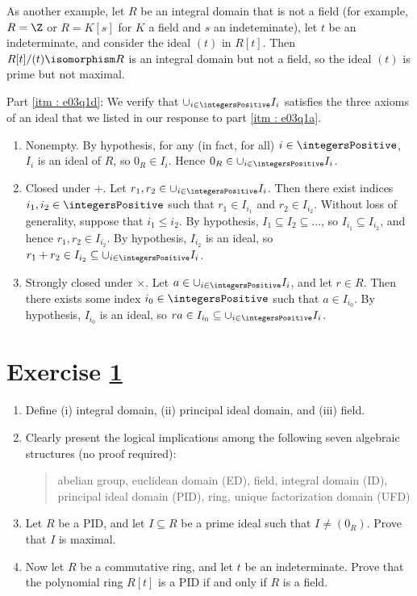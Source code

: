 {As another example, let $R$ be an integral domain that is not a field (for example, $R = \Z$ or $R = K[s]$ for $K$ a field and $s$ an indeteminate), let $t$ be an indeterminate, and consider the ideal $(t)$ in $R[t]$. Then $R[t] / (t) \isomorphism R$ is an integral domain but not a field, so the ideal $(t)$ is prime but not maximal.

Part \ref{itm : e03q1d}: We verify that $\cup_{i \in \integersPositive} I_{i}$ satisfies the three axioms of an ideal that we listed in our response to part \ref{itm : e03q1a}.
\begin{enumerate}
\item Nonempty. By hypothesis, for any (in fact, for all) $i \in \integersPositive$, $I_{i}$ is an ideal of $R$, so $0_{R} \in I_{i}$. Hence $0_{R} \in \cup_{i \in \integersPositive} I_{i}$.
\item Closed under $+$. Let $r_{1}, r_{2} \in \cup_{i \in \integersPositive} I_{i}$. Then there exist indices $i_{1}, i_{2} \in \integersPositive$ such that $r_{1} \in I_{i_{1}}$ and $r_{2} \in I_{i_{2}}$. Without loss of generality, suppose that $i_{1} \leq i_{2}$. By hypothesis, $I_{1} \subseteq I_{2} \subseteq \ldots$, so $I_{i_{1}} \subseteq I_{i_{2}}$, and hence $r_{1}, r_{2} \in I_{i_{2}}$. By hypothesis, $I_{i_{2}}$ is an ideal, so $r_{1} + r_{2} \in I_{i_{2}} \subseteq \cup_{i \in \integersPositive} I_{i}$.
\item Strongly closed under $\times$. Let $a \in \cup_{i \in \integersPositive} I_{i}$, and let $r \in R$. Then there exists some index $i_{0} \in \integersPositive$ such that $a \in I_{i_{0}}$. By hypothesis, $I_{i_{0}}$ is an ideal, so $r a \in I_{i_{0}} \subseteq \cup_{i \in \integersPositive} I_{i}$.
\end{enumerate}}%



\section{Exercise \ref{sec : e03q2}}
\label{sec : e03q2}

\begin{enumerate}[label=(\alph*)]
\item\label{itm : e03q2a} Define (i) integral domain, (ii) principal ideal domain, and (iii) field.
\item\label{itm : e03q2b} Clearly present the logical implications among the following seven algebraic structures (no proof required):
\begin{quote}
abelian group, euclidean domain (ED), field, integral domain (ID), principal ideal domain (PID), ring, unique factorization domain (UFD)
\end{quote}
\item\label{itm : e03q2c} Let $R$ be a PID, and let $I \subseteq R$ be a prime ideal such that $I \neq (0_{R})$. Prove that $I$ is maximal.
\item\label{itm : e03q2d} Now let $R$ be a commutative ring, and let $t$ be an indeterminate. Prove that the polynomial ring $R[t]$ is a PID if and only if $R$ is a field.
\end{enumerate}

